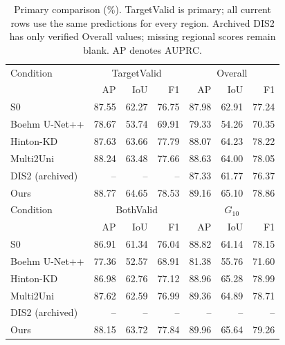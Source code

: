 \begin{table}[!t]
\caption{Primary comparison (\%). TargetValid is primary; all current rows use the same predictions for every region. Archived DIS2 has only verified Overall values; missing regional scores remain blank. AP denotes AUPRC.}
\label{tab:primary}
\centering\scriptsize
\setlength{\tabcolsep}{2.1pt}
\renewcommand{\arraystretch}{1.03}
\begin{tabular}{lrrrrrr}
\toprule
Condition & \multicolumn{3}{c}{TargetValid} & \multicolumn{3}{c}{Overall}\\
 & AP & IoU & F1 & AP & IoU & F1\\
\midrule
S0 & 87.55 & 62.27 & 76.75 & 87.98 & 62.91 & 77.24\\
Boehm U-Net++ \cite{Boehm2022} & 78.67 & 53.74 & 69.91 & 79.33 & 54.26 & 70.35\\
Hinton-KD \cite{Hinton2015} & 87.63 & 63.66 & 77.79 & 88.07 & 64.23 & 78.22\\
Multi2Uni & 88.24 & 63.48 & 77.66 & 88.63 & 64.00 & 78.05\\
DIS2 (archived) \cite{Kieu2026DIS2} & -- & -- & -- & 87.33 & 61.77 & 76.37\\
Ours & 88.77 & 64.65 & 78.53 & 89.16 & 65.10 & 78.86\\
\midrule
Condition & \multicolumn{3}{c}{BothValid} & \multicolumn{3}{c}{$G_{10}$}\\
 & AP & IoU & F1 & AP & IoU & F1\\
\midrule
S0 & 86.91 & 61.34 & 76.04 & 88.82 & 64.14 & 78.15\\
Boehm U-Net++ \cite{Boehm2022} & 77.36 & 52.57 & 68.91 & 81.38 & 55.76 & 71.60\\
Hinton-KD \cite{Hinton2015} & 86.98 & 62.76 & 77.12 & 88.96 & 65.28 & 78.99\\
Multi2Uni & 87.62 & 62.59 & 76.99 & 89.36 & 64.89 & 78.71\\
DIS2 (archived) \cite{Kieu2026DIS2} & -- & -- & -- & -- & -- & --\\
Ours & 88.15 & 63.72 & 77.84 & 89.96 & 65.64 & 79.26\\
\bottomrule
\end{tabular}
\end{table}
